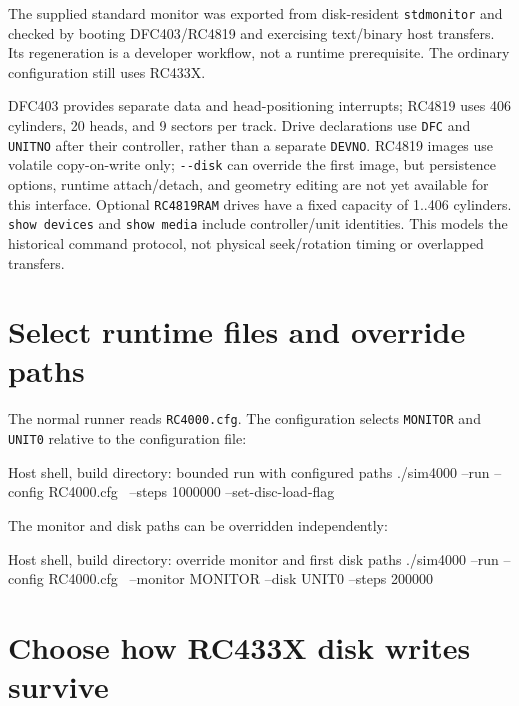 The supplied standard monitor was exported from disk-resident \texttt{stdmonitor}
and checked by booting DFC403/RC4819 and exercising text/binary host transfers.
Its regeneration is a developer workflow, not a runtime prerequisite.
The ordinary configuration still uses RC433X.

DFC403 provides separate data and head-positioning interrupts; RC4819 uses 406 cylinders, 20 heads, and 9 sectors per track. Drive declarations use \passthrough{\lstinline!DFC!} and \passthrough{\lstinline!UNITNO!} after their controller, rather than a separate \passthrough{\lstinline!DEVNO!}. RC4819 images use volatile copy-on-write only; \passthrough{\lstinline!--disk!} can override the first image, but persistence options, runtime attach/detach, and geometry editing are not yet available for this interface. Optional \passthrough{\lstinline!RC4819RAM!} drives have a fixed capacity of 1..406 cylinders. \passthrough{\lstinline!show devices!} and \passthrough{\lstinline!show media!} include controller/unit identities. This models the historical command protocol, not physical seek/rotation timing or overlapped transfers.

\section{Select runtime files and override paths}\label{select-runtime-files-and-override-paths}

The normal runner reads \passthrough{\lstinline!RC4000.cfg!}. The configuration selects \passthrough{\lstinline!MONITOR!} and \passthrough{\lstinline!UNIT0!} relative to the configuration file:

\begin{commandexample}[language=sh]{Host shell, build directory: bounded run with configured paths}
./sim4000 --run --config RC4000.cfg \
  --steps 1000000 --set-disc-load-flag
\end{commandexample}

The monitor and disk paths can be overridden independently:

\begin{commandexample}[language=sh]{Host shell, build directory: override monitor and first disk paths}
./sim4000 --run --config RC4000.cfg \
  --monitor MONITOR --disk UNIT0 --steps 200000
\end{commandexample}

\section{Choose how RC433X disk writes survive}\label{choose-how-rc433x-disk-writes-survive}

